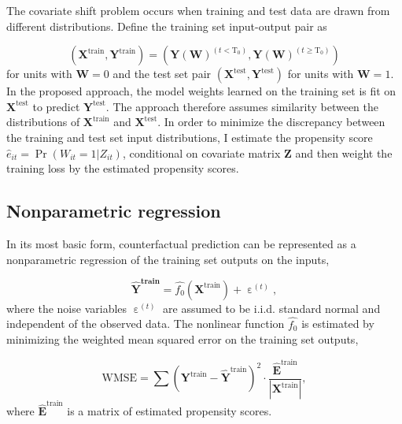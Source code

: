 The covariate shift problem occurs when training and test data are drawn from different distributions. Define the training set input-output pair as 

$$\left(\boldsymbol{X}^{\text{train}}, \boldsymbol{Y}^{\text{train}}\right) = \left(\boldsymbol{Y}(\boldsymbol{W})^{\left(t < \text{T}_0\right)}, \boldsymbol{Y}(\boldsymbol{W})^{\left(t \geq \text{T}_0\right)}\right)$$
\noindent
for units with $\boldsymbol{W}=0$ and the test set pair $\left(\boldsymbol{X}^{\text{test}}, \boldsymbol{Y}^{\text{test}}\right)$ for units with $\boldsymbol{W}=1$. In the proposed approach, the model weights learned on the training set is fit on $\boldsymbol{X}^{\text{test}}$ to predict $\boldsymbol{Y}^{\text{test}}$. The approach therefore assumes similarity between the distributions of $\boldsymbol{X}^{\text{train}}$ and $\boldsymbol{X}^{\text{test}}$. In order to minimize the discrepancy between the training and test set input distributions, I estimate the propensity score $\hat{e}_{it} = \Pr(W_{it}=1 | Z_{it})$, conditional on covariate matrix $\boldsymbol{Z}$ and then weight the training loss by the estimated propensity scores. 

\subsection{Nonparametric regression}

In its most basic form, counterfactual prediction can be represented as a nonparametric regression of the training set outputs on the inputs,

\begin{equation}\label{eq:np}
	\boldsymbol{\hat{\boldsymbol{Y}}^{\text{train}}} =  \hat{f_0} \left(\boldsymbol{X}^{\text{train}}\right) + \upepsilon^{(t)},
\end{equation}
\noindent
where the noise variables $\upepsilon^{(t)}$ are assumed to be i.i.d. standard normal and independent of the observed data. The nonlinear function $\hat{f_0}$ is estimated by minimizing the weighted mean squared error on the training set outputs, 

\begin{equation} \label{eq:mse}
	\text{WMSE} = \sum \left(\boldsymbol{Y}^{\text{train}} - \boldsymbol{\hat{Y}}^{\text{train}}  \right)^2  \cdot \frac{\boldsymbol{\hat{E}}^\text{train}}{|\boldsymbol{X}^\text{train}|},
\end{equation}
\noindent
where $\boldsymbol{\hat{E}}^\text{train}$ is a matrix of estimated propensity scores. 

